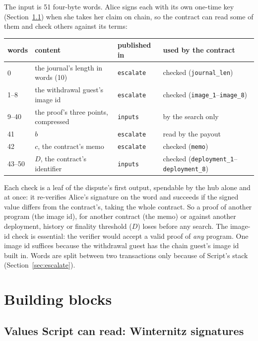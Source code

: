 \documentclass[11pt]{article}
\newcommand{\tx}[1]{\texttt{#1}}
\begin{document}
The input is 51 four-byte words. Alice signs each with its own one-time
key (Section~\ref{sec:wots}) when she takes her claim on chain, so the
contract can read some of them and check others against its terms:
\begin{center}
\small
\begin{tabular}{llll}
\toprule
words & content & published in & used by the contract \\
\midrule
0 & the journal's length in words (10) & \tx{escalate} & checked (\tx{journal\_len}) \\
1--8 & the withdrawal guest's image id & \tx{escalate} & checked (\tx{image\_1}--\tx{image\_8}) \\
9--40 & the proof's three points, compressed & \tx{inputs} & by the search only \\
41 & $b$ & \tx{escalate} & read by the payout \\
42 & $c$, the contract's memo & \tx{escalate} & checked (\tx{memo}) \\
43--50 & $D$, the contract's identifier & \tx{inputs} & checked (\tx{deployment\_1}--\tx{deployment\_8}) \\
\bottomrule
\end{tabular}
\end{center}
Each check is a leaf of the dispute's first output, spendable by the hub
alone and at once: it re-verifies Alice's signature on the word and
succeeds if the signed value differs from the contract's, taking the
whole contract. So a proof of another program (the image id), for
another contract (the memo) or against another deployment, history or
finality threshold ($D$) loses before any search. The image-id check is
essential: the verifier would accept a valid proof of \emph{any}
program. One image id suffices because the withdrawal guest has the
chain guest's image id built in. Words are split between two
transactions only because of Script's stack (Section~\ref{sec:escalate}).

\section{Building blocks}
\label{sec:blocks}

\subsection{Values Script can read: Winternitz signatures}
\label{sec:wots}
\end{document}
